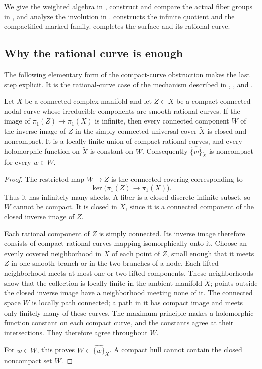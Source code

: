 We give the weighted algebra in , construct and compare the actual fiber groups in , and analyze the involution in .  constructs the infinite quotient and the compactified marked family.  completes the surface and its rational curve.

\subsection{Why the rational curve is enough}

The following elementary form of the compact-curve obstruction makes the last step explicit. It is the rational-curve case of the mechanism described in \citet[pp.~136--137]{LasellRamachandran1996}, \citet[pp.~527--528]{KatzarkovRamachandran1998}, and \citet[author manuscript, \S4.1]{BogomolovKatzarkov1998}.

\begin{lemma}\label{lem:rational-hull}
Let $X$ be a connected complex manifold and let $Z\subset X$ be a compact connected nodal curve whose irreducible components are smooth rational curves. If the image of $\pi_1(Z)\to\pi_1(X)$ is infinite, then every connected component $W$ of the inverse image of $Z$ in the simply connected universal cover $\widetilde X$ is closed and noncompact. It is a locally finite union of compact rational curves, and every holomorphic function on $\widetilde X$ is constant on $W$.
Consequently $\widehat{\{w\}}_{\widetilde X}$ is noncompact for every $w\in W$.
\end{lemma}

\begin{proof}
The restricted map $W\to Z$ is the connected covering corresponding to
\[
 \ker\bigl(\pi_1(Z)\longrightarrow\pi_1(X)\bigr).
\]
Thus it has infinitely many sheets. A fiber is a closed discrete infinite subset, so $W$ cannot be compact. It is closed in $\widetilde X$, since it is a connected component of the closed inverse image of $Z$.

Each rational component of $Z$ is simply connected. Its inverse image therefore consists of compact rational curves mapping isomorphically onto it. Choose an evenly covered neighborhood in $X$ of each point of $Z$, small enough that it meets $Z$ in one smooth branch or in the two branches of a node. Each lifted neighborhood meets at most one or two lifted components. These neighborhoods show that the collection is locally finite in the ambient manifold $\widetilde X$; points outside the closed inverse image have a neighborhood meeting none of it. The connected space $W$ is locally path connected; a path in it has compact image and meets only finitely many of these curves. The maximum principle makes a holomorphic function constant on each compact curve, and the constants agree at their intersections. They therefore agree throughout $W$.

For $w\in W$, this proves $W\subset\widehat{\{w\}}_{\widetilde X}$. A compact hull cannot contain the closed noncompact set $W$.
\end{proof}
